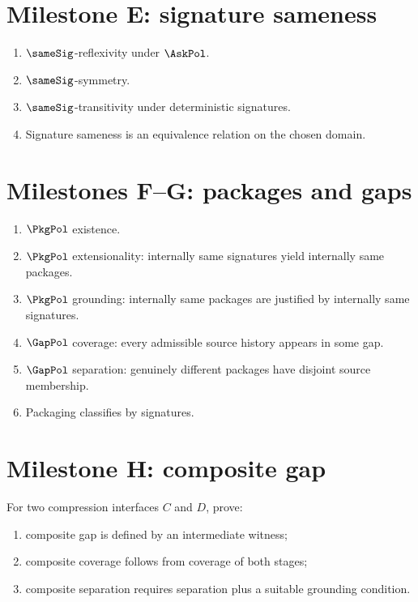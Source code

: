\section{Milestone E: signature sameness}

\begin{enumerate}
  \item \(\sameSig\)-reflexivity under \(\AskPol\).
  \item \(\sameSig\)-symmetry.
  \item \(\sameSig\)-transitivity under deterministic signatures.
  \item Signature sameness is an equivalence relation on the chosen domain.
\end{enumerate}

\section{Milestones F--G: packages and gaps}

\begin{enumerate}
  \item \(\PkgPol\) existence.
  \item \(\PkgPol\) extensionality: internally same signatures yield internally same packages.
  \item \(\PkgPol\) grounding: internally same packages are justified by internally same signatures.
  \item \(\GapPol\) coverage: every admissible source history appears in some gap.
  \item \(\GapPol\) separation: genuinely different packages have disjoint source membership.
  \item Packaging classifies by signatures.
\end{enumerate}

\section{Milestone H: composite gap}

For two compression interfaces \(C\) and \(D\), prove:
\begin{enumerate}
  \item composite gap is defined by an intermediate witness;
  \item composite coverage follows from coverage of both stages;
  \item composite separation requires separation plus a suitable grounding condition.
\end{enumerate}

